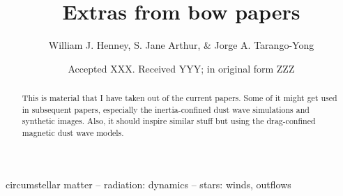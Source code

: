 \documentclass[useAMS, usenatbib, a4paper]{mnras}
\title
{Extras from bow papers}
\author[Henney, Arthur, \& Tarango Yong]{
  William J. Henney, S. Jane Arthur, \& Jorge A. Tarango-Yong\\
  \AddressCRyA
}
\date{Accepted XXX. Received YYY; in original form ZZZ}
\begin{document}
\label{firstpage}
\pagerange{\pageref{firstpage}--\pageref{lastpage}}
\maketitle
\begin{abstract}
  This is material that I have taken out of the current papers.  Some
  of it might get used in subsequent papers, especially the
  inertia-confined dust wave simulations and synthetic images.  Also,
  it should inspire similar stuff but using the drag-confined magnetic
  dust wave models.
\end{abstract}

\begin{keywords}
  circumstellar matter -- radiation: dynamics -- stars: winds, outflows
\end{keywords}






\bsp	%
\label{lastpage}
\end{document}
